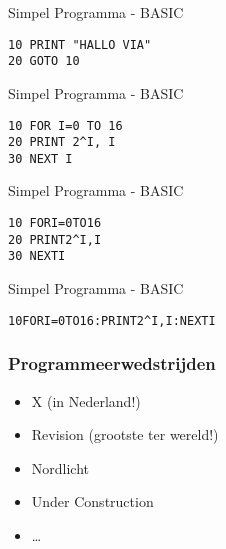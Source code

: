 \documentclass[aspectratio=43]{uva-inf-presentation}
\begin{document}

\begin{frame}[fragile]{Simpel Programma - BASIC}

\begin{lstlisting}
10 PRINT "HALLO VIA"
20 GOTO 10
\end{lstlisting}

\end{frame}


\begin{frame}[fragile]{Simpel Programma - BASIC}

\begin{lstlisting}
10 FOR I=0 TO 16
20 PRINT 2^I, I
30 NEXT I
\end{lstlisting}

\end{frame}


\begin{frame}[fragile]{Simpel Programma - BASIC}

\begin{lstlisting}
10 FORI=0TO16
20 PRINT2^I,I
30 NEXTI
\end{lstlisting}

\end{frame}


\begin{frame}[fragile]{Simpel Programma - BASIC}

\begin{lstlisting}
10FORI=0TO16:PRINT2^I,I:NEXTI
\end{lstlisting}

\end{frame}








\begin{frame}
\frametitle{Programmeerwedstrijden}

\begin{itemize}
\item X (in Nederland!)
\item Revision (grootste ter wereld!)
\item Nordlicht
\item Under Construction
\item \dots
\end{itemize}

\end{frame}
\end{document}
